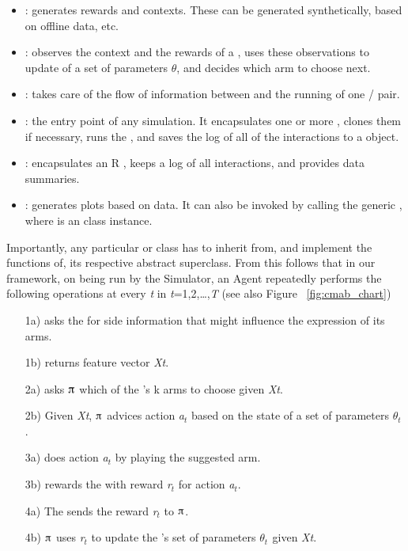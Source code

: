 \documentclass[nojss]{jss}\usepackage[]{graphicx}\usepackage[]{color}
\begin{document}
\begin{itemize}
         \item {}: generates rewards and contexts. These can be generated synthetically, based on offline data, etc.
         \item {}: observes the context and the rewards of a , uses these observations to update of a set of parameters $\theta$, and decides which arm to choose next.
         \item {}: takes care of the flow of information between and the running of one / pair.
         \item {}: the entry point of any  simulation. It encapsulates one or more , clones them if necessary, runs the , and saves the log of all of the  interactions to a  object.
         \item {}: encapsulates an R , keeps a log of all interactions, and provides data summaries.
         \item {}: generates plots based on  data. It can also be invoked by calling the generic , where  is an  class instance.
\end{itemize}

Importantly, any particular  or  class has to inherit from, and implement the functions of, its respective abstract superclass. From this follows that in our framework, on being run by the Simulator, an Agent repeatedly performs the following operations at every \textit{t} in \textit{t}=1,2,{\dots},\textit{T} (see also Figure ~\ref{fig:cmab_chart})

\begin{enumerate}
         \item[1a)]  asks the  for side information that might influence the expression of its arms.
         \item[1b)]  returns feature vector \textit{Xt}.
         \item[2a)]  asks  $\piup$ which of the 's k arms to choose given \textit{Xt}.
         \item[2b)] Given \textit{Xt},  $\piup$ advices action \textit{a${}_{t}$} based on the state of a set of parameters \textit{$\theta$${}_{t}$${}_{  }$}.
         \item[3a)]  does action \textit{a${}_{t}$} by playing the suggested  arm.
         \item[3b)]  rewards the  with reward \textit{r${}_{t}$ }for action \textit{a${}_{t}$}.
         \item[4a)] The  sends the reward\textit{ r${}_{t}$ }to  $\piup$.
         \item[4b)]  $\piup$ uses \textit{r${}_{t}$} to update the 's set of parameters\textit{ $\theta$${}_{t}$${}_{  }$} given \textit{Xt}.
\end{enumerate}
\end{document}
